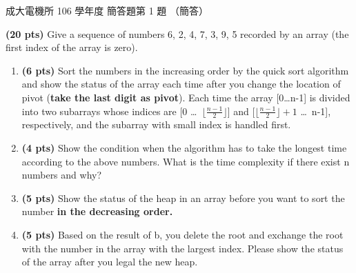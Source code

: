 \begin{pastexam}[label={px:ncku-106-ee-ds-05}]{成大電機所 106 學年度 簡答題第 1 題}
（簡答）

\textbf{(20 pts)} Give a sequence of numbers 6, 2, 4, 7, 3, 9, 5 recorded by an array (the first index of the
array is zero).
\begin{enumerate}[label=\alph*.]
\item \textbf{(6 pts)} Sort the numbers in the increasing order by the quick sort algorithm and show the status
of the array each time after you change the location of pivot (\textbf{take the last digit as pivot}). Each
time the array [0\ldots n-1] is divided into two subarrays whose indices are
[0 \ldots\ $\lfloor\frac{n-1}{2}\rfloor$] and [$\lfloor\frac{n-1}{2}\rfloor+1$ \ldots\ n-1], respectively,
and the subarray with small index is handled first.
\item \textbf{(4 pts)} Show the condition when the algorithm has to take the longest time according to the
above numbers. What is the time complexity if there exist n numbers and why?
\item \textbf{(5 pts)} Show the status of the heap in an array before you want to sort the number
\textbf{in the decreasing order.}
\item \textbf{(5 pts)} Based on the result of b, you delete the root and exchange the root with the number in
the array with the largest index. Please show the status of the array after you legal the new heap.
\end{enumerate}
\end{pastexam}

